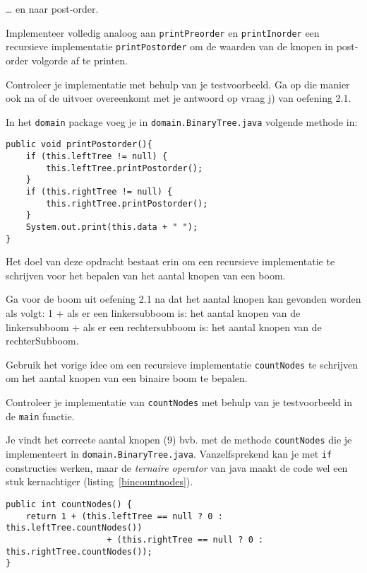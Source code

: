 \begin{oef}
\code … en naar post-order.
\begin{oefenumerate}
	\item Implementeer volledig analoog aan \verb=printPreorder= en \verb=printInorder= een recursieve implementatie \verb=printPostorder= om de waarden van de knopen in post-order volgorde af te printen.
	\item Controleer je implementatie met behulp van je testvoorbeeld. Ga op die manier ook na of de uitvoer  overeenkomt met je antwoord op vraag j) van oefening 2.1.
\end{oefenumerate}
\begin{opl}
In het \verb+domain+ package voeg je in \verb+domain.BinaryTree.java+ volgende methode in:
\begin{lstlisting}[caption={Post-order doorloop van een binaire boom}, label=binpostorder]
public void printPostorder(){
	if (this.leftTree != null) {
		this.leftTree.printPostorder();
	}
	if (this.rightTree != null) {
		this.rightTree.printPostorder();
	}
	System.out.print(this.data + " ");
}
\end{lstlisting}
\end{opl}
\end{oef}


\begin{oef}
\code Het doel van deze opdracht bestaat erin om een recursieve implementatie te schrijven voor het bepalen van het aantal knopen van een boom.

\begin{oefenumerate}
	\item Ga voor de boom uit oefening 2.1 na dat het aantal knopen kan gevonden worden als volgt:  1 + als er een linkersubboom is: het aantal knopen van de linkersubboom  + als er een rechtersubboom is: het aantal knopen van de rechterSubboom.
	\item Gebruik het vorige idee om een recursieve implementatie \verb=countNodes= te schrijven om het aantal knopen van een binaire boom te bepalen.
	\item Controleer je implementatie van \verb=countNodes= met behulp van je testvoorbeeld in de \verb=main= functie.
\end{oefenumerate}
\begin{opl}
Je vindt het correcte aantal knopen (9) bvb. met de methode \verb+countNodes+ die je implementeert in \verb+domain.BinaryTree.java+. Vanzelfsprekend kan je met \verb+if+ constructies werken, maar de \emph{ternaire operator} van java maakt de code wel een stuk kernachtiger (listing~\ref{bincountnodes}).
\begin{lstlisting}[caption={Tel het aantal knopen in een binaire boom}, label=bincountnodes]
public int countNodes() {
	return 1 + (this.leftTree == null ? 0 : this.leftTree.countNodes())
					+ (this.rightTree == null ? 0 : this.rightTree.countNodes());
}
\end{lstlisting}
\end{opl}
\end{oef}


